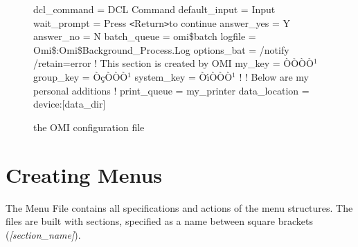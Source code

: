 \documentclass[a4paper]{book}
\newcommand{\lt}{\texttt{<}}
\newcommand{\gt}{\texttt{>}}
\renewcommand{\indent}{\hspace*{5mm}}
\begin{document}
\begin{figure}[h!tb]
\begin{minipage}[h!tb]{\textwidth}
\begin{ttfamily}
\indent dcl{\_}command = DCL Command \newline
\indent default{\_}input = Input \newline
\indent wait{\_}prompt = Press \lt Return\gt  to continue \newline
\indent answer{\_}yes = Y \newline
\indent answer{\_}no = N \newline
 \newline
\noindent[bgrprocess] \newline
\indent batch{\_}queue = omi{\$}batch \newline
\indent logfile = Omi{\$}:Omi{\$}Background{\_}Process.Log \newline
\indent options{\_}bat = /notify /retain=error \newline
 \newline
\noindent[keyring] ! This section is created by OMI \newline
\indent my{\_}key = \`{O}\`{O}\`{O}\`{O}$^{1}$ \newline
\indent group{\_}key = \`{O}\c{c}\`{O}\`{O}\`{O}$^{1}$ \newline
\indent system{\_}key = \`{O}\'{\i}\`{O}\`{O}\`{O}$^{1}$ \newline
 \newline
\noindent! \newline
\noindent! Below are my personal additions \newline
\noindent! \newline
\noindent[mydefs] \newline
\indent print{\_}queue = my{\_}printer \newline
\indent data{\_}location = device:[data{\_}dir] \newline
\end{ttfamily} \newline
\caption{the OMI configuration file}\label{fig:omiconfig}
\hrulefill
\end{minipage}
\end{figure}

\chapter{Creating Menus}
\label{sec:creating}

The Menu File contains all specifications and actions of the menu 
structures. The files are built with sections, specified as a name between 
square brackets (\textsl{[section{\_}name]}).
\end{document}
